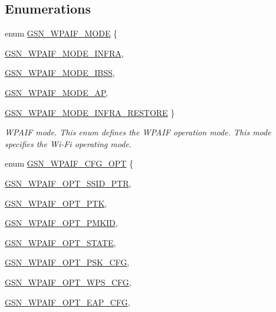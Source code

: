 \subsection*{Enumerations}
\begin{DoxyCompactItemize}
\item 
enum \hyperlink{a00687_gaa611307c118e60b86fe3447c4dd9ef03}{GSN\_\-WPAIF\_\-MODE} \{ \par
\hyperlink{a00687_ggaa611307c118e60b86fe3447c4dd9ef03a8f02aa9b67e320b42a583c337a06032c}{GSN\_\-WPAIF\_\-MODE\_\-INFRA}, 
\par
\hyperlink{a00687_ggaa611307c118e60b86fe3447c4dd9ef03a7c79ee92b43c049eb8820c6526f83c7b}{GSN\_\-WPAIF\_\-MODE\_\-IBSS}, 
\par
\hyperlink{a00687_ggaa611307c118e60b86fe3447c4dd9ef03a1824a98b218f76b78f6d4aec183dd95a}{GSN\_\-WPAIF\_\-MODE\_\-AP}, 
\par
\hyperlink{a00687_ggaa611307c118e60b86fe3447c4dd9ef03a29cd0996b9ecb2e8c37f1d4a3e3b489c}{GSN\_\-WPAIF\_\-MODE\_\-INFRA\_\-RESTORE}
 \}
\begin{DoxyCompactList}\small\item\em WPAIF mode. This enum defines the WPAIF operation mode. This mode specifies the Wi-\/Fi operating mode. \end{DoxyCompactList}\item 
enum \hyperlink{a00687_ga0f2a6686511220638235644511dee215}{GSN\_\-WPAIF\_\-CFG\_\-OPT} \{ \par
\hyperlink{a00687_gga0f2a6686511220638235644511dee215a4bc8f7a5e627200ce23927fdbd6bd035}{GSN\_\-WPAIF\_\-OPT\_\-SSID\_\-PTR}, 
\par
\hyperlink{a00687_gga0f2a6686511220638235644511dee215a1dfeb9a125e497101305800dccac1b8c}{GSN\_\-WPAIF\_\-OPT\_\-PTK}, 
\par
\hyperlink{a00687_gga0f2a6686511220638235644511dee215a047df613fbb70a0656f02f7da2e90bc5}{GSN\_\-WPAIF\_\-OPT\_\-PMKID}, 
\par
\hyperlink{a00687_gga0f2a6686511220638235644511dee215a005f740966425393bfcfdf3701f52852}{GSN\_\-WPAIF\_\-OPT\_\-STATE}, 
\par
\hyperlink{a00687_gga0f2a6686511220638235644511dee215af1d9eb946929ad5adb45397ce028fb63}{GSN\_\-WPAIF\_\-OPT\_\-PSK\_\-CFG}, 
\par
\hyperlink{a00687_gga0f2a6686511220638235644511dee215ab301a42eaf26381c3661b7c4d796052b}{GSN\_\-WPAIF\_\-OPT\_\-WPS\_\-CFG}, 
\par
\hyperlink{a00687_gga0f2a6686511220638235644511dee215ac7c1de1b14107e27fbf404718d49c6fa}{GSN\_\-WPAIF\_\-OPT\_\-EAP\_\-CFG}, 

\end{DoxyCompactItemize}
